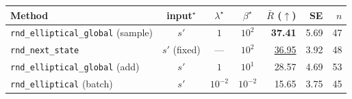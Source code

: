 \begin{tabular}{@{}>{\raggedright\arraybackslash}p{4.3cm} c c c r r r@{}}
\toprule
\textbf{Method} & \textbf{input$^\star$} & \textbf{$\lambda^\star$} & \textbf{$\beta^\star$} & \textbf{$\bar{R}$ ($\uparrow$)} & \textbf{SE} & \textbf{$n$} \\
\midrule
\texttt{rnd\_\allowbreak elliptical\_\allowbreak global} (sample) & $s'$ & $1$ & $10^{2}$ & \textbf{37.41} & 5.69 & 47 \\
\texttt{rnd\_\allowbreak next\_\allowbreak state} & $s'$ (fixed) & --- & $10^{2}$ & \underline{36.95} & 3.92 & 48 \\
\texttt{rnd\_\allowbreak elliptical\_\allowbreak global} (add) & $s'$ & $1$ & $10^{1}$ & 28.57 & 4.69 & 53 \\
\texttt{rnd\_\allowbreak elliptical} (batch) & $s'$ & $10^{-2}$ & $10^{-2}$ & 15.65 & 3.75 & 45 \\
\bottomrule
\end{tabular}
